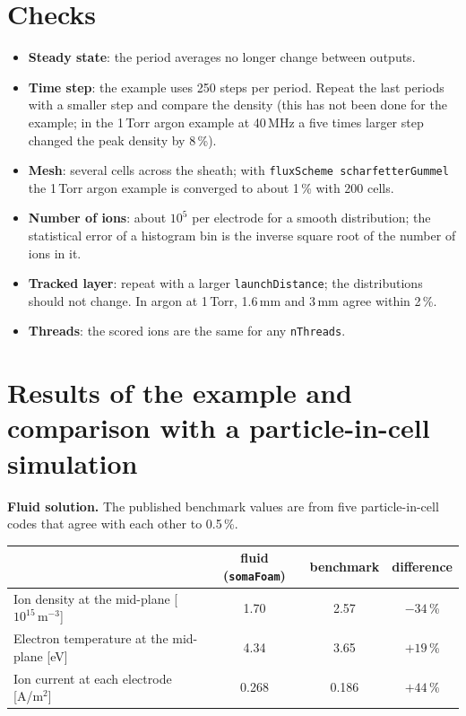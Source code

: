 \documentclass[10pt,a4paper]{article}
\newcommand{\kw}[1]{\texttt{#1}}
\begin{document}
\section{Checks}

\begin{itemize}[leftmargin=1.4em,itemsep=1pt]
\item \textbf{Steady state}: the period averages no longer change between
  outputs.
\item \textbf{Time step}: the example uses 250 steps per period. Repeat the
  last periods with a smaller step and compare the density (this has not
  been done for the example; in the 1\,Torr argon example at 40\,MHz a five
  times larger step changed the peak density by 8\,\%).
\item \textbf{Mesh}: several cells across the sheath; with
  \kw{fluxScheme scharfetterGummel} the 1\,Torr argon example is converged
  to about 1\,\% with 200 cells.
\item \textbf{Number of ions}: about $10^5$ per electrode for a smooth
  distribution; the statistical error of a histogram bin is the inverse
  square root of the number of ions in it.
\item \textbf{Tracked layer}: repeat with a larger \kw{launchDistance}; the
  distributions should not change. In argon at 1\,Torr, 1.6\,mm and 3\,mm
  agree within 2\,\%.
\item \textbf{Threads}: the scored ions are the same for any \kw{nThreads}.
\end{itemize}

\section{Results of the example and comparison with a particle-in-cell
simulation}

\textbf{Fluid solution.} The published benchmark values are from five
particle-in-cell codes that agree with each other to 0.5\,\%.

\begin{center}
\begin{tabular}{@{}lccc@{}}
\toprule
 & fluid (\kw{somaFoam}) & benchmark & difference \\
\midrule
Ion density at the mid-plane [$10^{15}$\,m$^{-3}$] & 1.70 & 2.57 & $-34$\,\% \\
Electron temperature at the mid-plane [eV] & 4.34 & 3.65 & $+19$\,\% \\
Ion current at each electrode [A/m$^2$] & 0.268 & 0.186 & $+44$\,\% \\
\bottomrule
\end{tabular}
\end{center}
\end{document}
